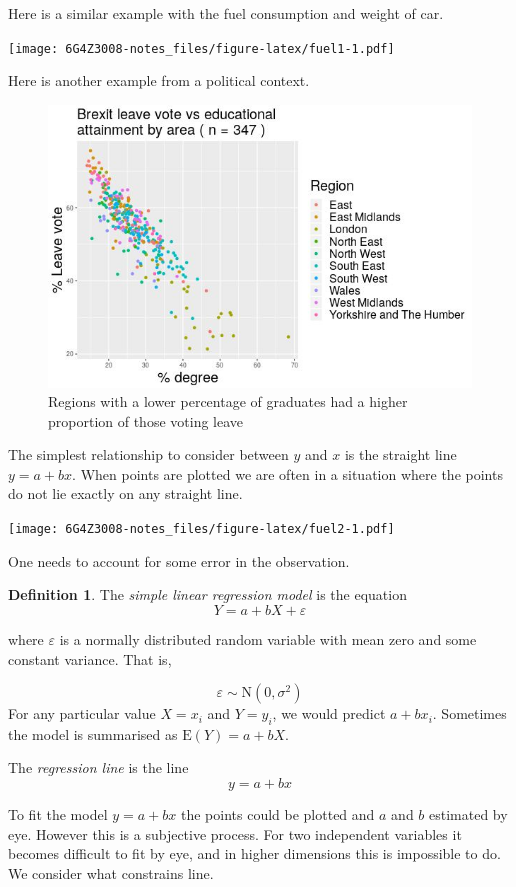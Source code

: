 \documentclass[
]{book}
\theoremstyle{definition}
\newtheorem{definition}{Definition}[chapter]
\theoremstyle{definition}
\theoremstyle{definition}
\theoremstyle{definition}
\theoremstyle{remark}
\begin{document}
Here is a similar example with the fuel consumption and weight of car.

\texttt{[image: 6G4Z3008-notes\_files/figure-latex/fuel1-1.pdf]}

Here is another example from a political context.

\begin{figure}

{\centering \includegraphics[width=0.75\linewidth]{./figures/Brexit} 

}

\caption{Regions with a lower percentage of graduates had a higher proportion of those voting leave}\label{fig:brexit}
\end{figure}

The simplest relationship to consider between \(y\) and \(x\) is the straight line \(y=a+bx\). When points are plotted we are often in a situation where the points do not lie exactly on any straight line.

\texttt{[image: 6G4Z3008-notes\_files/figure-latex/fuel2-1.pdf]}

One needs to account for some error in the observation.

\begin{definition}
The \emph{simple linear regression model} is the equation
\[Y=a+bX+\varepsilon\]

where \(\varepsilon\) is a normally distributed random variable with mean zero and some constant variance. That is,

\[\varepsilon \sim \text{N}(0,\sigma^2)\]
For any particular value \(X=x_i\) and \(Y = y_i\), we would predict \(a+bx_i\). Sometimes the model is summarised as \(\text{E}(Y)=a+bX\).

The \emph{regression line} is the line
\[y = a +bx\]
\end{definition}

To fit the model \(y=a+bx\) the points could be plotted and \(a\) and \(b\) estimated by eye. However this is a subjective process. For two independent variables it becomes difficult to fit by eye, and in higher dimensions this is impossible to do. We consider what constrains line.
\end{document}
